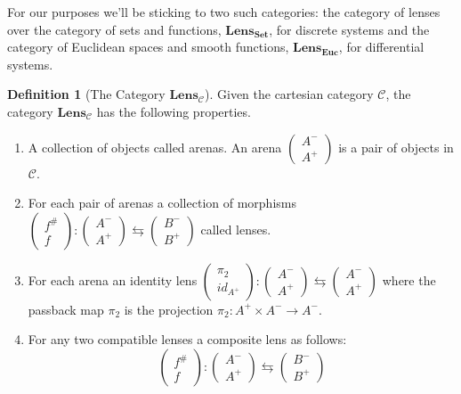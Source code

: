 \documentclass{article}
\theoremstyle{definition}
\newtheorem{definition}{Definition}
\begin{document}
For our purposes we'll be sticking to two such categories: the category of lenses over the category of sets and functions, $\textbf{Lens}_{\textbf{Set}}$, for discrete systems and the category of Euclidean spaces and smooth functions, $\textbf{Lens}_\textbf{Euc}$, for differential systems.
\pagebreak
\begin{definition}[The Category $\textbf{Lens}_\mathcal{C}$]
    Given the cartesian category $\mathcal{C}$, the category $\textbf{Lens}_{\mathcal{C}}$ has the following properties.
    \begin{enumerate}
        \item A collection of objects called arenas. An arena $\begin{pmatrix}A^-\\A^+\end{pmatrix}$ is a pair of objects in $\mathcal{C}$.
        \item For each pair of arenas a collection of morphisms $\begin{pmatrix}f^{\#}\\f\end{pmatrix}:\begin{pmatrix}A^-\\A^+\end{pmatrix}\leftrightarrows\begin{pmatrix}B^-\\B^+\end{pmatrix}$ called lenses.
        \item For each arena an identity lens $\begin{pmatrix}\pi_2\\id_{A^+}\end{pmatrix}:\begin{pmatrix}A^-\\A^+\end{pmatrix}\leftrightarrows\begin{pmatrix}A^-\\A^+\end{pmatrix}$ where the passback map $\pi_2$ is the projection $\pi_2:A^+ \times A^- \rightarrow A^-$.
        \item For any two compatible lenses a composite lens as follows:
              $$\begin{pmatrix}f^{\#}\\f\end{pmatrix}:\begin{pmatrix}A^-\\A^+\end{pmatrix}\leftrightarrows\begin{pmatrix}B^-\\B^+\end{pmatrix}$$

\end{enumerate}
\end{definition}
\end{document}
